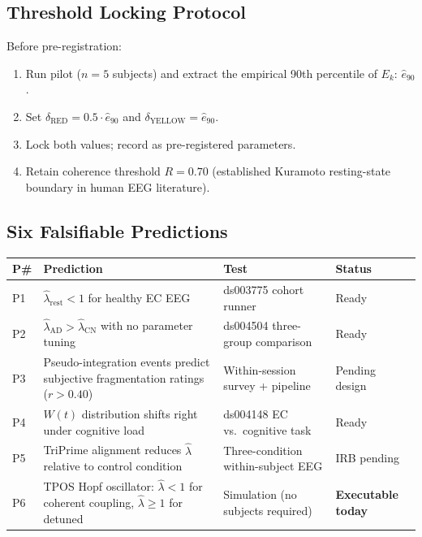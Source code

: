 \documentclass[12pt,a4paper]{article}
\theoremstyle{definition}
\newcommand{\lhat}{\hat{\lambda}}
\begin{document}
\subsection{Threshold Locking Protocol}

Before pre-registration:
\begin{enumerate}[leftmargin=*]
  \item Run pilot ($n=5$ subjects) and extract the empirical 90th
        percentile of $E_k$: $\hat{e}_{90}$.
  \item Set $\delta_{\mathrm{RED}} = 0.5 \cdot \hat{e}_{90}$ and
        $\delta_{\mathrm{YELLOW}} = \hat{e}_{90}$.
  \item Lock both values; record as pre-registered parameters.
  \item Retain coherence threshold $R = 0.70$ (established Kuramoto
        resting-state boundary in human EEG literature).
\end{enumerate}

\subsection{Six Falsifiable Predictions}

\begin{longtable}{@{}p{1.5cm}p{5.5cm}p{4.5cm}p{2cm}@{}}
  \toprule
  \textbf{P\#} & \textbf{Prediction} & \textbf{Test} &
  \textbf{Status} \\
  \midrule
  P1 & $\lhat_\mathrm{rest} < 1$ for healthy EC EEG &
    ds003775 cohort runner & Ready \\
  P2 & $\lhat_\mathrm{AD} > \lhat_\mathrm{CN}$ with no parameter tuning &
    ds004504 three-group comparison & Ready \\
  P3 & Pseudo-integration events predict subjective fragmentation
    ratings ($r > 0.40$) &
    Within-session survey + pipeline & Pending design \\
  P4 & $W(t)$ distribution shifts right under cognitive load &
    ds004148 EC vs.\ cognitive task & Ready \\
  P5 & TriPrime alignment reduces $\lhat$ relative to control condition &
    Three-condition within-subject EEG & IRB pending \\
  P6 & TPOS Hopf oscillator: $\lhat < 1$ for coherent coupling,
    $\lhat \geq 1$ for detuned & Simulation (no subjects required) &
    \textbf{Executable today} \\
  \bottomrule
\end{longtable}
\end{document}
